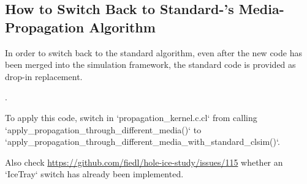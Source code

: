 
\subsection{How to Switch Back to Standard-\clsim's Media-Propagation Algorithm}
\label{sec:how_to_switch_media_propagation}

In order to switch back to the standard \clsim algorithm, even after the new code has been merged into the \icecube simulation framework, the standard \clsim code is provided as drop-in replacement.

.

To apply this code, switch in `propagation_kernel.c.cl` from calling `apply_propagation_through_different_media()` to `apply_propagation_through_different_media_with_standard_clsim()`.

Also check \url{https://github.com/fiedl/hole-ice-study/issues/115} whether an `IceTray` switch has already been implemented.